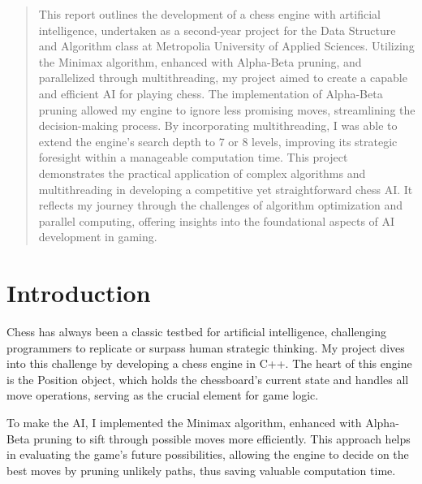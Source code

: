 \documentclass{article}
\begin{document}
\begin{abstract}
This report outlines the development of a chess engine with artificial intelligence, undertaken as a second-year project for the Data Structure and Algorithm class at Metropolia University of Applied Sciences. Utilizing the Minimax algorithm, enhanced with Alpha-Beta pruning, and parallelized through multithreading, my project aimed to create a capable and efficient AI for playing chess. The implementation of Alpha-Beta pruning allowed my engine to ignore less promising moves, streamlining the decision-making process. By incorporating multithreading, I was able to extend the engine's search depth to 7 or 8 levels, improving its strategic foresight within a manageable computation time. This project demonstrates the practical application of complex algorithms and multithreading in developing a competitive yet straightforward chess AI. It reflects my journey through the challenges of algorithm optimization and parallel computing, offering insights into the foundational aspects of AI development in gaming.
\end{abstract}







\newpage

\tableofcontents

\newpage




\section{Introduction}
Chess has always been a classic testbed for artificial intelligence, challenging programmers to replicate or surpass human strategic thinking. My project dives into this challenge by developing a chess engine in C++. The heart of this engine is the Position object, which holds the chessboard's current state and handles all move operations, serving as the crucial element for game logic.

To make the AI, I implemented the Minimax algorithm, enhanced with Alpha-Beta pruning to sift through possible moves more efficiently. This approach helps in evaluating the game's future possibilities, allowing the engine to decide on the best moves by pruning unlikely paths, thus saving valuable computation time.
\end{document}
